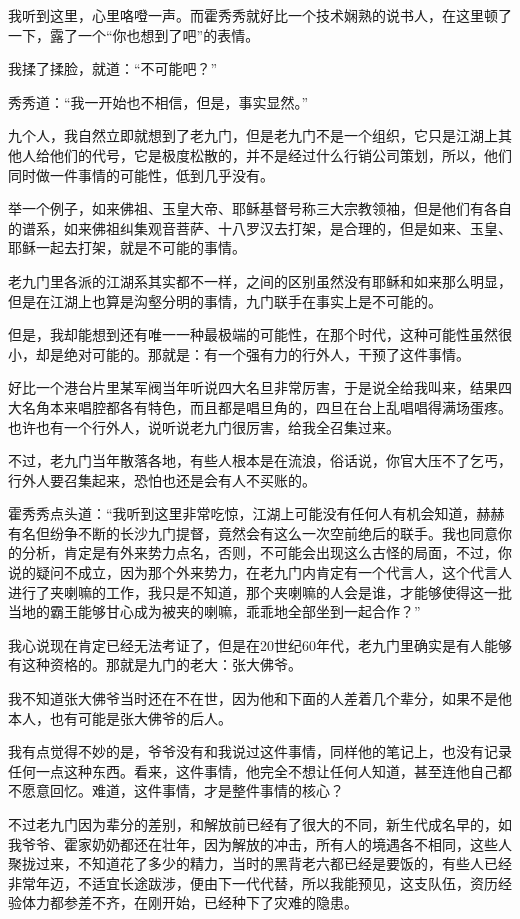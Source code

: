我听到这里，心里咯噔一声。而霍秀秀就好比一个技术娴熟的说书人，在这里顿了一下，露了一个“你也想到了吧”的表情。

我揉了揉脸，就道：“不可能吧？”

秀秀道：“我一开始也不相信，但是，事实显然。”

九个人，我自然立即就想到了老九门，但是老九门不是一个组织，它只是江湖上其他人给他们的代号，它是极度松散的，并不是经过什么行销公司策划，所以，他们同时做一件事情的可能性，低到几乎没有。

举一个例子，如来佛祖、玉皇大帝、耶稣基督号称三大宗教领袖，但是他们有各自的谱系，如来佛祖纠集观音菩萨、十八罗汉去打架，是合理的，但是如来、玉皇、耶稣一起去打架，就是不可能的事情。

老九门里各派的江湖系其实都不一样，之间的区别虽然没有耶稣和如来那么明显，但是在江湖上也算是沟壑分明的事情，九门联手在事实上是不可能的。

但是，我却能想到还有唯一一种最极端的可能性，在那个时代，这种可能性虽然很小，却是绝对可能的。那就是：有一个强有力的行外人，干预了这件事情。

好比一个港台片里某军阀当年听说四大名旦非常厉害，于是说全给我叫来，结果四大名角本来唱腔都各有特色，而且都是唱旦角的，四旦在台上乱唱唱得满场蛋疼。也许也有一个行外人，说听说老九门很厉害，给我全召集过来。

不过，老九门当年散落各地，有些人根本是在流浪，俗话说，你官大压不了乞丐，行外人要召集起来，恐怕也还是会有人不买账的。

霍秀秀点头道：“我听到这里非常吃惊，江湖上可能没有任何人有机会知道，赫赫有名但纷争不断的长沙九门提督，竟然会有这么一次空前绝后的联手。我也同意你的分析，肯定是有外来势力点名，否则，不可能会出现这么古怪的局面，不过，你说的疑问不成立，因为那个外来势力，在老九门内肯定有一个代言人，这个代言人进行了夹喇嘛的工作，我只是不知道，那个夹喇嘛的人会是谁，才能够使得这一批当地的霸王能够甘心成为被夹的喇嘛，乖乖地全部坐到一起合作？”

我心说现在肯定已经无法考证了，但是在20世纪60年代，老九门里确实是有人能够有这种资格的。那就是九门的老大：张大佛爷。

我不知道张大佛爷当时还在不在世，因为他和下面的人差着几个辈分，如果不是他本人，也有可能是张大佛爷的后人。

我有点觉得不妙的是，爷爷没有和我说过这件事情，同样他的笔记上，也没有记录任何一点这种东西。看来，这件事情，他完全不想让任何人知道，甚至连他自己都不愿意回忆。难道，这件事情，才是整件事情的核心？

不过老九门因为辈分的差别，和解放前已经有了很大的不同，新生代成名早的，如我爷爷、霍家奶奶都还在壮年，因为解放的冲击，所有人的境遇各不相同，这些人聚拢过来，不知道花了多少的精力，当时的黑背老六都已经是要饭的，有些人已经非常年迈，不适宜长途跋涉，便由下一代代替，所以我能预见，这支队伍，资历经验体力都参差不齐，在刚开始，已经种下了灾难的隐患。

